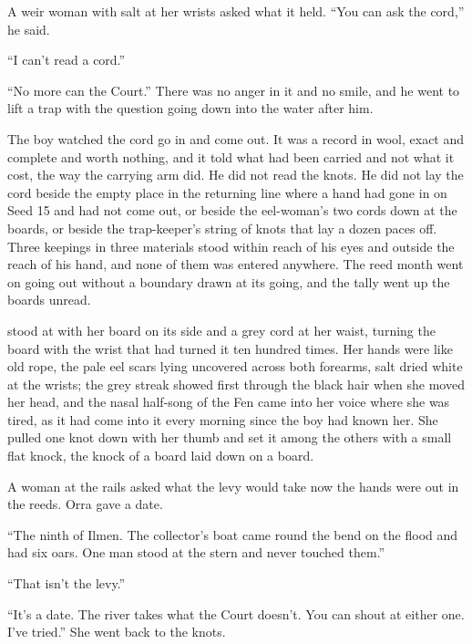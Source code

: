 A weir woman with salt at her wrists asked what it held. “You can ask the cord,” he said.

“I can't read a cord.”

“No more can the Court.” There was no anger in it and no smile, and he went to lift a trap with the question going down into the water after him.

The boy watched the cord go in and come out. It was a record in wool, exact and complete and worth nothing, and it told what had been carried and not what it cost, the way the carrying arm did. He did not read the knots. He did not lay the cord beside the empty place in the returning line where a hand had gone in on Seed 15 and had not come out, or beside the eel-woman's two cords down at the boards, or beside the trap-keeper's string of knots that lay a dozen paces off. Three keepings in three materials stood within reach of his eyes and outside the reach of his hand, and none of them was entered anywhere. The reed month went on going out without a boundary drawn at its going, and the tally went up the boards unread.

\scenebreak

 stood at  with her board on its side and a grey cord at her waist, turning the board with the wrist that had turned it ten hundred times. Her hands were like old rope, the pale eel scars lying uncovered across both forearms, salt dried white at the wrists; the grey streak showed first through the black hair when she moved her head, and the nasal half-song of the Fen came into her voice where she was tired, as it had come into it every morning since the boy had known her. She pulled one knot down with her thumb and set it among the others with a small flat knock, the knock of a board laid down on a board.

A woman at the rails asked what the levy would take now the hands were out in the reeds. Orra gave a date.

“The ninth of Ilmen. The collector's boat came round the bend on the flood and had six oars. One man stood at the stern and never touched them.”

“That isn't the levy.”

“It's a date. The river takes what the Court doesn't. You can shout at either one. I've tried.” She went back to the knots.

